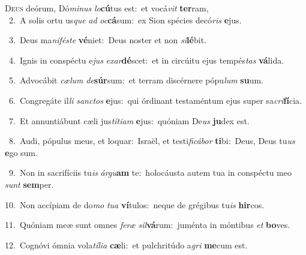 \lettrine{\initial\textcolor{\initialcolor}{D}}{eus} deórum, Dó\-\textit{mi}\-\textit{nus} \textit{lo}\-\textbf{cú}tus est:~\star et vocá\textit{vit} \textbf{ter}\-ram,\\
{\numbfont\textcolor{\numbcolor}{~2.}}~A solis ortu us\textit{que} \textit{ad} \textit{oc}\-\textbf{cá}sum:~\star ex Sion spécies decó\textit{ris} \textbf{e}\-jus.\par
{\numbfont\textcolor{\numbcolor}{~3.}}~Deus ma\-\textit{ni}\-\textit{fés}\textit{te} \textbf{vé}\-niet:~\star Deus noster et non \textit{si}\-\textbf{lé}bit.\par
{\numbfont\textcolor{\numbcolor}{~4.}}~Ignis in conspéctu e\textit{jus} \textit{ex}\-\textit{ar}\textbf{dé}scet:~\star et in circúitu ejus tempés\textit{tas} \textbf{vá}\-lida.\par
{\numbfont\textcolor{\numbcolor}{~5.}}~Advocábit \textit{cæ}\-\textit{lum} \textit{de}\-\textbf{súr}sum:~\star et terram discérnere pópu\textit{lum} \textbf{su}\-um.\par
{\numbfont\textcolor{\numbcolor}{~6.}}~Congregáte il\textit{li} \textit{sanc}\-\textit{tos} \textbf{e}\-jus:~\star qui órdinant testaméntum ejus super sa\-\textit{cri}\-\textbf{fí}cia.\par
{\numbfont\textcolor{\numbcolor}{~7.}}~Et annuntiábunt cæli jus\-\textit{tí}\-\textit{ti}\textit{am} \textbf{e}\-jus:~\star quóniam De\textit{us} \textbf{ju}\-dex est.\par
{\numbfont\textcolor{\numbcolor}{~8.}}~Audi, pópulus meus, et loquar:~\dagger Israël, et testi\-\textit{fi}\-\textit{cá}\textit{bor} \textbf{ti}\-bi:~\star Deus, Deus tu\textit{us} \textbf{e}\-go sum.\par
{\numbfont\textcolor{\numbcolor}{~9.}}~Non in sacrifíciis tu\textit{is} \textit{ár}\-\textit{gu}\textbf{am} te:~\star holocáusta autem tua in conspéctu meo \textit{sunt} \textbf{sem}\-per.\par
{\numbfont\textcolor{\numbcolor}{10.}}~Non accípiam de do\textit{mo} \textit{tu}\-\textit{a} \textbf{ví}\-tulos:~\star neque de grégibus tu\textit{is} \textbf{hir}\-cos.\par
{\numbfont\textcolor{\numbcolor}{11.}}~Quóniam meæ sunt omnes \textit{fe}\-\textit{ræ} \textit{sil}\-\textbf{vá}rum:~\star juménta in móntibus \textit{et} \textbf{bo}\-ves.\par
{\numbfont\textcolor{\numbcolor}{12.}}~Cognóvi ómnia vola\-\textit{tí}\-\textit{li}\textit{a} \textbf{cæ}\-li:~\star et pulchritúdo a\textit{gri} \textbf{me}\-cum est.\par
